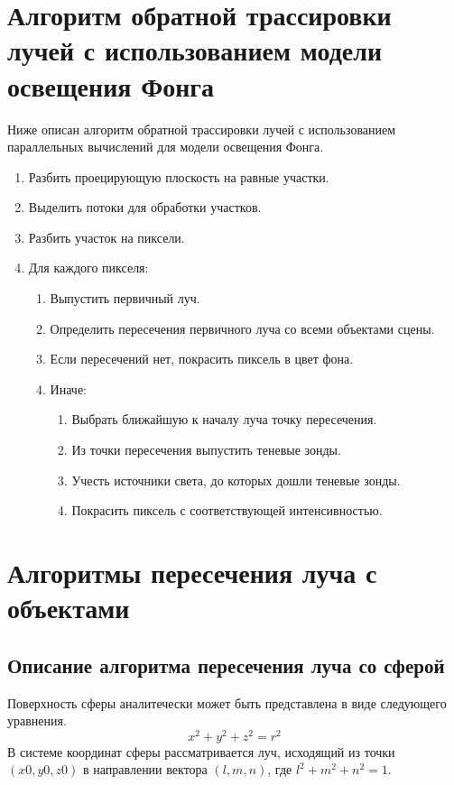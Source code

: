 \section{Алгоритм обратной трассировки лучей с использованием модели освещения Фонга}

Ниже описан алгоритм обратной трассировки лучей с использованием параллельных вычислений для модели освещения Фонга. 


\begin{enumerate}
	\item Разбить проецирующую плоскость на равные участки.
	\item Выделить потоки для обработки участков.
	\item Разбить участок на пиксели.
	\item Для каждого пикселя:
	\begin{enumerate}
		\item Выпустить первичный луч.
		\item Определить пересечения первичного луча со всеми объектами сцены.
		\item Если пересечений нет, покрасить пиксель в цвет фона.
		\item Иначе:
		\begin{enumerate}
				\item Выбрать ближайшую к началу луча точку пересечения.
				\item Из точки пересечения выпустить теневые зонды.
				\item Учесть источники света, до которых дошли теневые зонды.
				\item Покрасить пиксель с соответствующей интенсивностью.
		\end{enumerate}
	\end{enumerate}
\end{enumerate}


\section{Алгоритмы пересечения луча с объектами}

\subsection{Описание алгоритма пересечения луча со сферой}

Поверхность сферы аналитечески может быть представлена в виде следующего уравнения.
\begin{equation*}
	x^2 + y^2 + z^2 = r^2
\end{equation*}
В системе координат сферы рассматривается луч, исходящий из точки $(x0, y0, z0)$ в направлении вектора $(l, m, n)$, где $l^2 + m^2 + n^2 = 1$.

